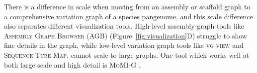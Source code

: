 There is a difference in scale when moving from an assembly or scaffold graph to a comprehensive variation graph of a species pangenome, and this scale difference also separates different visualization tools.
High-level assembly-graph tools like \textsc{Assembly Graph Browser} (\textsc{AGB}) \citep{Mikheenko_2019} (Figure~\ref{fig:visualization}D) struggle to show fine details in the graph, while low-level variation graph tools like \textsc{vg view} \cite{Garrison_2018} and \textsc{Sequence Tube Map}, cannot scale to large graphs.
One tool which works well at both large scale and high detail is \textsc{MoMI-G} \cite{yokoyama_momi-g:_2019}. 
